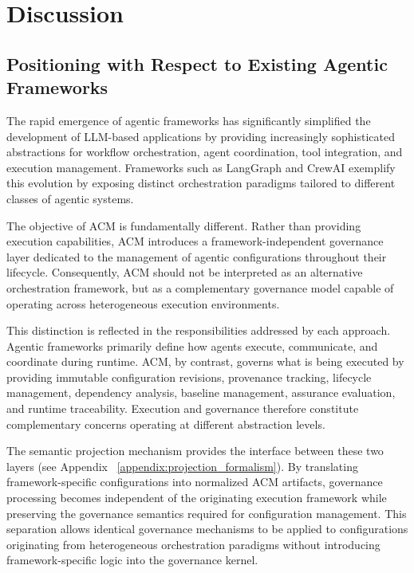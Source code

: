 \documentclass[10pt]{article}
\begin{document}
\section{Discussion}
\label{sec:discussion}
\subsection{Positioning with Respect to Existing Agentic Frameworks}
\label{sec:positioning}

The rapid emergence of agentic frameworks has significantly simplified the development of LLM-based applications by providing increasingly sophisticated abstractions for workflow orchestration, agent coordination, tool integration, and execution management. Frameworks such as LangGraph and CrewAI exemplify this evolution by exposing distinct orchestration paradigms tailored to different classes of agentic systems.

The objective of ACM is fundamentally different. Rather than providing execution capabilities, ACM introduces a framework-independent governance layer dedicated to the management of agentic configurations throughout their lifecycle. Consequently, ACM should not be interpreted as an alternative orchestration framework, but as a complementary governance model capable of operating across heterogeneous execution environments.

This distinction is reflected in the responsibilities addressed by each approach. Agentic frameworks primarily define how agents execute, communicate, and coordinate during runtime. ACM, by contrast, governs what is being executed by providing immutable configuration revisions, provenance tracking, lifecycle management, dependency analysis, baseline management, assurance evaluation, and runtime traceability. Execution and governance therefore constitute complementary concerns operating at different abstraction levels.

The semantic projection mechanism provides the interface between these two layers (see Appendix ~\ref{appendix:projection_formalism}). By translating framework-specific configurations into normalized ACM artifacts, governance processing becomes independent of the originating execution framework while preserving the governance semantics required for configuration management. This separation allows identical governance mechanisms to be applied to configurations originating from heterogeneous orchestration paradigms without introducing framework-specific logic into the governance kernel.
\end{document}
